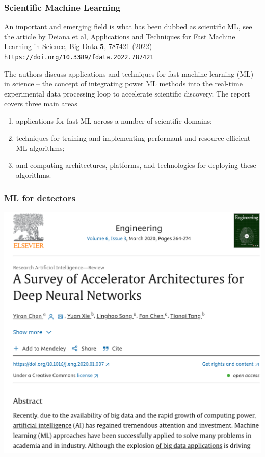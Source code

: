 \documentclass{beamer}
\begin{document}
\begin{frame}
\frametitle{Scientific Machine Learning}

An important and emerging field is what has been dubbed as scientific ML, see the article by Deiana et al, Applications and Techniques for Fast Machine Learning in Science, Big Data \textbf{5}, 787421 (2022) \href{{https://doi.org/10.3389/fdata.2022.787421}}{\nolinkurl{https://doi.org/10.3389/fdata.2022.787421}}

\begin{block}{}
The authors discuss applications and techniques for fast machine
learning (ML) in science -- the concept of integrating power ML
methods into the real-time experimental data processing loop to
accelerate scientific discovery. The report covers three main areas

\begin{enumerate}
\item applications for fast ML across a number of scientific domains;

\item techniques for training and implementing performant and resource-efficient ML algorithms;

\item and computing architectures, platforms, and technologies for deploying these algorithms.
\end{enumerate}

\noindent
\end{block}
\end{frame}

\begin{frame}
\frametitle{ML for detectors}

\vspace{6mm}

\centerline{\includegraphics[width=1.0\linewidth]{figures/detectors.png}}

\vspace{6mm}
\end{frame}
\end{document}
